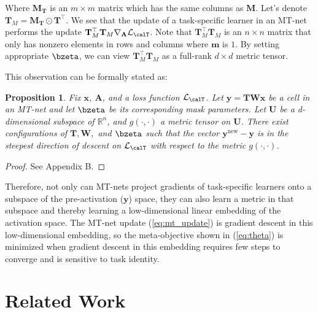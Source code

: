 \documentclass{article}
\newtheorem{prop}{Proposition}
\newcommand{\x}{\mathbf{x}}
\newcommand{\y}{\mathbf{y}}
\newcommand{\A}{\mathbf{A}}
\newcommand{\W}{\mathbf{W}}
\newcommand{\T}{\mathbf{T}}
\newcommand{\M}{\mathbf{M}}
\newcommand{\logit}{\bzeta}
\newcommand{\m}{\mathbf{m}}
\newcommand{\loss}{\mathcal{L}_{\calT}}
\newcommand{\U}{\mathbf{U}}
\newcommand{\mask}{\M}
\newcommand{\maskT}{\mask_{\T}}
\newcommand{\Rn}{\mathbb{R}^n}
\begin{document}
Where $\maskT$ is an $m \times m$ matrix which has the same columns as $\mask$.
Let's denote $\T_M=\maskT \odot \T^{\top}$.
We see that the update of a task-specific learner in an MT-net performs the update $\T_M^\top \T_M \nabla_{\A} \loss$.
Note that $\T_M^\top \T_M$ is an $n \times n$ matrix that only has nonzero elements in rows and columns where $\m$ is $1$.
By setting appropriate $\logit$, we can view $\T_M^\top \T_M$ as a full-rank $d \times d$ metric tensor.

This observation can be formally stated as:
\begin{prop}
\label{prop2}
Fix $\x$, $\A$, and a loss function $\loss$.
Let $\y = \T \W \x$ be a cell in an MT-net and let $\logit$ be its corresponding mask parameters.
Let $\U$ be a d-dimensional subspace of $\Rn$, and $g(\cdot , \cdot)$ a metric tensor on $\U$.
There exist configurations of $\T, \W,$ and $\logit$ such that the vector $\y^\text{new}-\y$ is in 
the steepest direction of descent on $\loss$ with respect to the metric $g(\cdot , \cdot)$.
\end{prop}

\begin{proof}
See Appendix B.
\end{proof}
Therefore, not only can MT-nets project gradients of task-specific learners onto a subspace of the pre-activation ($\y$) space,
they can also learn a metric in that subspace and thereby learning a low-dimensional linear embedding of the activation space.
The MT-net update (\ref{eq:mt_update}) is gradient descent in this low-dimensional embedding,
so the meta-objective shown in (\ref{eq:theta}) is minimized when gradient descent in this embedding requires few steps to converge and is sensitive to task identity.



\section{Related Work}

\iffalse
A straightforward approach for applying meta-learning to deep networks is to meta-learn some pattern of the weights of a neural network or its updates; previous work has learned an update rule \cite{RaviS2017iclr, Li2016nips, Andrychowicz2016nips}, directly generated weights \cite{Ha2017iclr}, or learned good initial weights to fine-tune \cite{FinnC2017arxiv}.
Another line of research uses recurrent neural networks to encode a learning rule and sequentially inputs training data to this neural network \cite{SantoroA2016icml,Mishra2018iclr,MunkhdalaiT2017icml,Duan2016arxiv, Wang2016arxiv}.
An approach that has been successful in the domain of few-shot classification is to learn a distance metric between images and use this metric to find the most similar previously seen image to a new image \cite{KochG2015icml, VinyalsO2016nips, SnellJ2017nips}.
\fi
\end{document}
